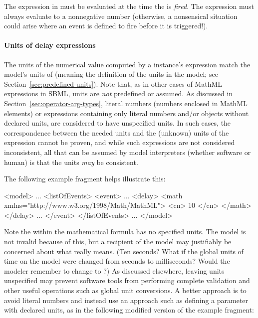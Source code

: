 The expression in  must be evaluated at the time the
 is \emph{fired}.  The expression must always evaluate to a
nonnegative number (otherwise, a nonsensical situation could arise
where an event is defined to fire before it is triggered!).  


\paragraph{Units of delay expressions}

The units of the numerical value computed by a \Delay instance's
 expression  match the model's units of
 (meaning the definition of the  units in
the model; see Section~\ref{sec:predefined-units}).  Note that, as
in other cases of MathML expressions in SBML, units are \emph{not}
predefined or assumed.  As discussed in
Section~\ref{sec:operator-arg-types}, literal numbers (\ie numbers
enclosed in MathML  elements) or expressions containing
only literal numbers and/or \Parameter objects without declared
units, are considered to have unspecified units.  In such cases,
the correspondence between the needed units and the (unknown)
units of the \Delay {} expression cannot be proven, and
while such expressions are not considered inconsistent, all that
can be assumed by model interpreters (whether software or human)
is that the units \emph{may} be consistent.

The following \Event example fragment helps illustrate this:

\begin{example}
<model>
    ...
    <listOfEvents>
        <event>
            ...
            <delay>
                <math xmlns="http://www.w3.org/1998/Math/MathML">
                    <cn> 10 </cn>
                </math>
            </delay>
            ...
        </event>
    </listOfEvents>
    ...
</model>
\end{example}

Note the  within the mathematical formula has
no specified units.  The model is not invalid because of this, but
a recipient of the model may justifiably be concerned about what
 really means.  (Ten seconds?  What if the global units of
time on the model were changed from seconds to milliseconds?
Would the modeler remember to change  to ?)
As discussed elsewhere, leaving units unspecified may prevent
software tools from performing complete validation and other
useful operations such as global unit conversions.  A better
approach is to avoid literal numbers and instead use an approach
such as defining a parameter with declared units, as in the
following modified version of the example fragment:

